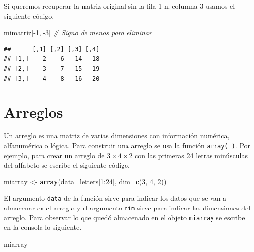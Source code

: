 \documentclass[10pt,]{krantz}
\makeatletter
\newenvironment{Shaded}{\begin{snugshade}}{\end{snugshade}}
\newcommand{\KeywordTok}[1]{\textcolor[rgb]{0.13,0.29,0.53}{\textbf{{#1}}}}
\newcommand{\DataTypeTok}[1]{\textcolor[rgb]{0.13,0.29,0.53}{{#1}}}
\newcommand{\DecValTok}[1]{\textcolor[rgb]{0.00,0.00,0.81}{{#1}}}
\newcommand{\StringTok}[1]{\textcolor[rgb]{0.31,0.60,0.02}{{#1}}}
\newcommand{\CommentTok}[1]{\textcolor[rgb]{0.56,0.35,0.01}{\textit{{#1}}}}
\newcommand{\NormalTok}[1]{{#1}}
\newenvironment{kframe}{%
\medskip{}
\setlength{\fboxsep}{.8em}
 \def\at@end@of@kframe{}%
 \ifinner\ifhmode%
  \def\at@end@of@kframe{\end{minipage}}%
  \begin{minipage}{\columnwidth}%
 \fi\fi%
 \def\FrameCommand##1{\hskip\@totalleftmargin \hskip-\fboxsep
 \colorbox{shadecolor}{##1}\hskip-\fboxsep
     \hskip-\linewidth \hskip-\@totalleftmargin \hskip\columnwidth}%
 \MakeFramed {\advance\hsize-\width
   \@totalleftmargin\z@ \linewidth\hsize
   \@setminipage}}%
 {\par\unskip\endMakeFramed%
 \at@end@of@kframe}
\renewenvironment{Shaded}{\begin{kframe}}{\end{kframe}}
\makeatother
\begin{document}
Si queremos recuperar la matriz original sin la fila 1 ni columna 3
usamos el siguiente código.

\begin{Shaded}
\begin{Highlighting}[]
\NormalTok{mimatriz[-}\DecValTok{1}\NormalTok{, -}\DecValTok{3}\NormalTok{]  }\CommentTok{# Signo de menos para eliminar}
\end{Highlighting}
\end{Shaded}

\begin{verbatim}
##      [,1] [,2] [,3] [,4]
## [1,]    2    6   14   18
## [2,]    3    7   15   19
## [3,]    4    8   16   20
\end{verbatim}

\section{\texorpdfstring{Arreglos 
}{Arreglos  }}\label{arreglos}

Un arreglo es una matriz de varias dimensiones con información numérica,
alfanumérica o lógica. Para construir una arreglo se usa la función
\texttt{array(\ )}. Por ejemplo, para crear un arreglo de
\(3 \times 4 \times 2\) con las primeras 24 letras minúsculas del
alfabeto se escribe el siguiente código.

\begin{Shaded}
\begin{Highlighting}[]
\NormalTok{miarray <-}\StringTok{ }\KeywordTok{array}\NormalTok{(}\DataTypeTok{data=}\NormalTok{letters[}\DecValTok{1}\NormalTok{:}\DecValTok{24}\NormalTok{], }\DataTypeTok{dim=}\KeywordTok{c}\NormalTok{(}\DecValTok{3}\NormalTok{, }\DecValTok{4}\NormalTok{, }\DecValTok{2}\NormalTok{))}
\end{Highlighting}
\end{Shaded}

El argumento \texttt{data} de la función sirve para indicar los datos
que se van a almacenar en el arreglo y el argumento \texttt{dim} sirve
para indicar las dimensiones del arreglo. Para observar lo que quedó
almacenado en el objeto \texttt{miarray} se escribe en la consola lo
siguiente.

\begin{Shaded}
\begin{Highlighting}[]
\NormalTok{miarray}
\end{Highlighting}
\end{Shaded}
\end{document}
